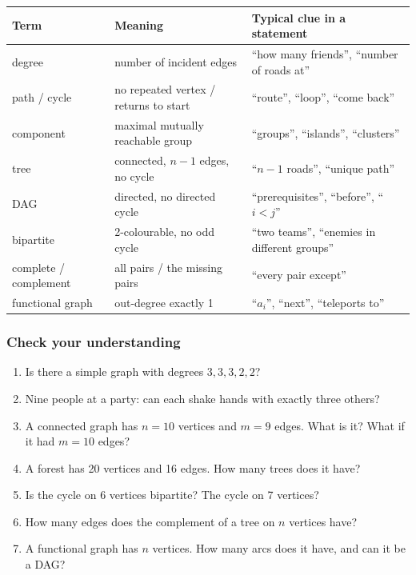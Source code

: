\begin{table}[H]
\centering\small
\begin{tabularx}{\linewidth}{@{}l X l@{}}
\toprule
\textbf{Term} & \textbf{Meaning} & \textbf{Typical clue in a statement} \\
\midrule
degree & number of incident edges & ``how many friends'', ``number of roads at'' \\
path / cycle & no repeated vertex / returns to start & ``route'', ``loop'', ``come back'' \\
component & maximal mutually reachable group & ``groups'', ``islands'', ``clusters'' \\
tree & connected, $n-1$ edges, no cycle & ``$n-1$ roads'', ``unique path'' \\
DAG & directed, no directed cycle & ``prerequisites'', ``before'', ``$i<j$'' \\
bipartite & 2-colourable, no odd cycle & ``two teams'', ``enemies in different groups'' \\
complete / complement & all pairs / the missing pairs & ``every pair except'' \\
functional graph & out-degree exactly 1 & ``$a_i$'', ``next'', ``teleports to'' \\
\bottomrule
\end{tabularx}
\end{table}

\subsubsection*{Check your understanding}

\begin{enumerate}[leftmargin=*]
    \item Is there a simple graph with degrees $3,3,3,2,2$?
    \item Nine people at a party: can each shake hands with exactly three others?
    \item A connected graph has $n=10$ vertices and $m=9$ edges. What is it? What if it had $m=10$ edges?
    \item A forest has 20 vertices and 16 edges. How many trees does it have?
    \item Is the cycle on 6 vertices bipartite? The cycle on 7 vertices?
    \item How many edges does the complement of a tree on $n$ vertices have?
    \item A functional graph has $n$ vertices. How many arcs does it have, and can it be a DAG?
\end{enumerate}

